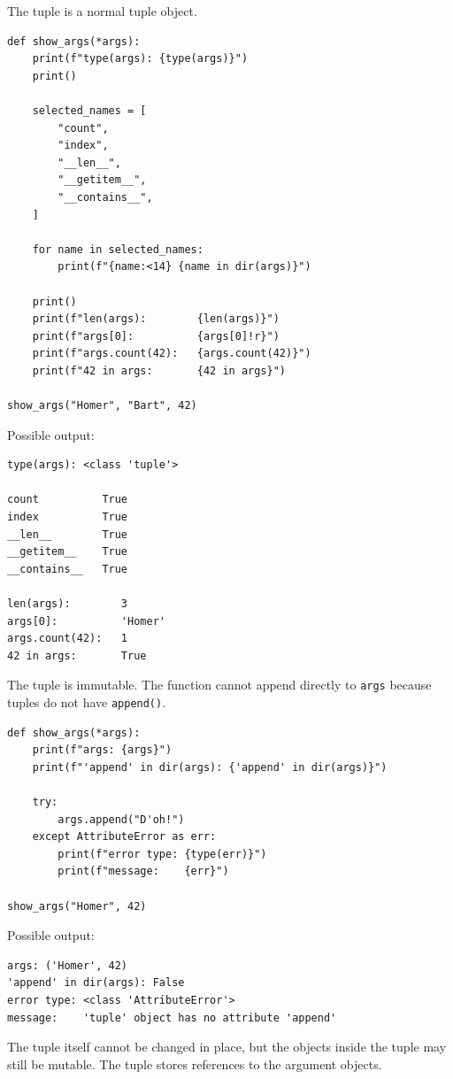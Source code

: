 The tuple is a normal tuple object.

\begin{verbatim}
def show_args(*args):
    print(f"type(args): {type(args)}")
    print()

    selected_names = [
        "count",
        "index",
        "__len__",
        "__getitem__",
        "__contains__",
    ]

    for name in selected_names:
        print(f"{name:<14} {name in dir(args)}")

    print()
    print(f"len(args):        {len(args)}")
    print(f"args[0]:          {args[0]!r}")
    print(f"args.count(42):   {args.count(42)}")
    print(f"42 in args:       {42 in args}")

show_args("Homer", "Bart", 42)
\end{verbatim}

Possible output:

\begin{verbatim}
type(args): <class 'tuple'>

count          True
index          True
__len__        True
__getitem__    True
__contains__   True

len(args):        3
args[0]:          'Homer'
args.count(42):   1
42 in args:       True
\end{verbatim}

The tuple is immutable. The function cannot append directly to \texttt{args} because tuples do not have \texttt{append()}.

\begin{verbatim}
def show_args(*args):
    print(f"args: {args}")
    print(f"'append' in dir(args): {'append' in dir(args)}")

    try:
        args.append("D'oh!")
    except AttributeError as err:
        print(f"error type: {type(err)}")
        print(f"message:    {err}")

show_args("Homer", 42)
\end{verbatim}

Possible output:

\begin{verbatim}
args: ('Homer', 42)
'append' in dir(args): False
error type: <class 'AttributeError'>
message:    'tuple' object has no attribute 'append'
\end{verbatim}

The tuple itself cannot be changed in place, but the objects inside the tuple may still be mutable. The tuple stores references to the argument objects.

